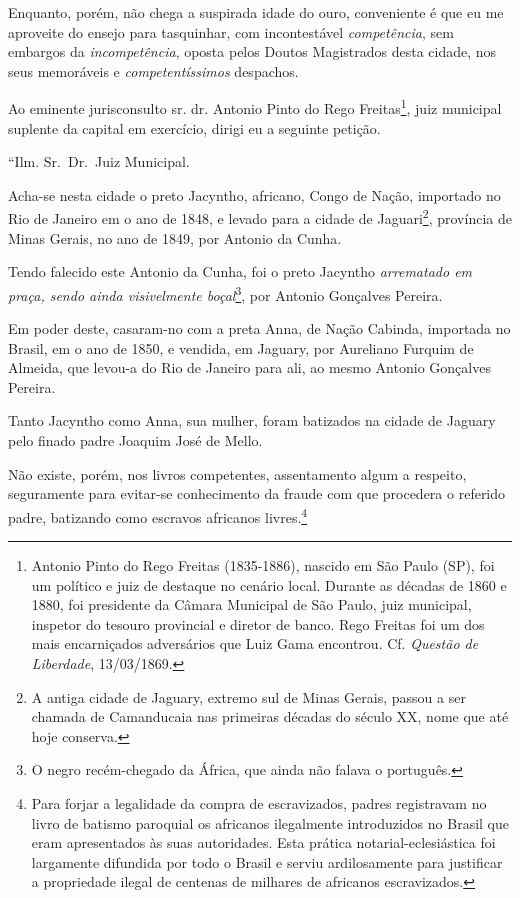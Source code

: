 Enquanto, porém, não chega a suspirada idade do ouro, conveniente é que
eu me aproveite do ensejo para tasquinhar, com incontestável
\emph{competência}, sem embargos da \emph{incompetência}, oposta pelos
Doutos Magistrados desta cidade, nos seus memoráveis e
\emph{competentíssimos} despachos.

Ao eminente jurisconsulto sr. dr. Antonio Pinto do Rego
Freitas\footnote{Antonio Pinto do Rego Freitas (1835-1886), nascido em
  São Paulo (SP), foi um político e juiz de destaque no cenário local.
  Durante as décadas de 1860 e 1880, foi presidente da Câmara Municipal
  de São Paulo, juiz municipal, inspetor do tesouro provincial e diretor
  de banco. Rego Freitas foi um dos mais encarniçados adversários que
  Luiz Gama encontrou. Cf. \emph{Questão de Liberdade}, 13/03/1869.},
juiz municipal suplente da capital em exercício, dirigi eu a seguinte
petição.

``Ilm. Sr.~Dr.~Juiz Municipal.

Acha-se nesta cidade o preto Jacyntho, africano, Congo de Nação,
importado no Rio de Janeiro em o ano de 1848, e levado para a cidade de
Jaguari\footnote{A antiga cidade de Jaguary, extremo sul de Minas
  Gerais, passou a ser chamada de Camanducaia nas primeiras décadas do
  século XX, nome que até hoje conserva.}, província de Minas Gerais, no
ano de 1849, por Antonio da Cunha.

Tendo falecido este Antonio da Cunha, foi o preto Jacyntho
\emph{arrematado em praça, sendo ainda visivelmente boçal}\footnote{O
  negro recém-chegado da África, que ainda não falava o português.}, por
Antonio Gonçalves Pereira.

Em poder deste, casaram-no com a preta Anna, de Nação Cabinda, importada
no Brasil, em o ano de 1850, e vendida, em Jaguary, por Aureliano
Furquim de Almeida, que levou-a do Rio de Janeiro para ali, ao mesmo
Antonio Gonçalves Pereira.

Tanto Jacyntho como Anna, sua mulher, foram batizados na cidade de
Jaguary pelo finado padre Joaquim José de Mello.

Não existe, porém, nos livros competentes, assentamento algum a
respeito, seguramente para evitar-se conhecimento da fraude com que
procedera o referido padre, batizando como escravos africanos
livres.\footnote{Para forjar a legalidade da compra de escravizados,
  padres registravam no livro de batismo paroquial os africanos
  ilegalmente introduzidos no Brasil que eram apresentados às suas
  autoridades. Esta prática notarial-eclesiástica foi largamente
  difundida por todo o Brasil e serviu ardilosamente para justificar a
  propriedade ilegal de centenas de milhares de africanos escravizados.}

